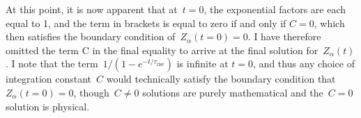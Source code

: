 \documentclass[12pt]{article}
\newcommand{\timescale}[1]{\ensuremath{\tau_\text{#1}}}
\begin{document}
At this point, it is now apparent that at~$t = 0$, the exponential factors are
each equal to 1, and the term in brackets is equal to zero if and only if
$C = 0$, which then satisfies the boundary condition of~$Z_\alpha(t = 0) = 0$.
I have therefore omitted the term C in the final equality to arrive at the
final solution for~$Z_\alpha(t)$.
I note that the term~$1 / (1 - e^{-t / \timescale{rise}})$ is infinite at
$t = 0$, and thus any choice of integration constant~$C$ would technically
satisfy the boundary condition that~$Z_\alpha(t = 0) = 0$, though~$C \neq 0$
solutions are purely mathematical and the~$C = 0$ solution is physical.


\newpage


\end{document}
